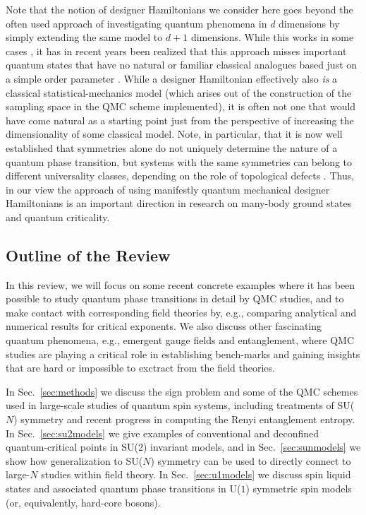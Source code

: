 \documentclass[range]{ar2e}
\begin{document}
Note that the notion of designer Hamiltonians we consider here goes beyond the often used approach of investigating quantum phenomena 
in $d$ dimensions by simply extending the same model to $d+1$ dimensions. While this works in some cases \cite{Rieger94,Sorensen92,Nahum11}, 
it has in recent years been realized that this approach misses important quantum states that have no natural or familiar classical 
analogues based just on a simple order parameter \cite{Senthil04a,Fradkin04,Sachdev08}. While a designer Hamiltonian effectively also {\it is} 
a classical statistical-mechanics model (which arises out of the construction of the sampling space in the QMC scheme implemented), it is 
often not one that would have come natural as a starting point just from the perspective of increasing the dimensionality of some
classical model. Note, in particular, that it is now well established that symmetries alone do not uniquely determine the nature of a 
quantum phase transition, but systems with the same symmetries can belong to different universality classes, depending on the role of topological 
defects \cite{Motrunich04}. Thus, in our view the approach of using manifestly quantum mechanical designer Hamiltonians is an important direction
in research on many-body ground states and quantum criticality.

\subsection{Outline of the Review}

In this review, we will focus on some recent concrete examples where it has been possible to study quantum phase transitions in detail 
by QMC studies, and to make contact with corresponding field theories by, e.g., comparing analytical and numerical results for critical 
exponents. We also discuss other fascinating quantum phenomena, e.g., emergent gauge fields and entanglement, where QMC studies are
playing a critical role in establishing bench-marks and gaining insights that are hard or impossible to exctract from the field theories.

In Sec.~\ref{sec:methods} we discuss the sign problem and some of the QMC schemes used in large-scale studies of quantum spin systems, 
including treatments of SU($N$) symmetry and recent progress in computing the Renyi entanglement entropy. In Sec.~\ref{sec:su2models} 
we give examples of conventional and deconfined quantum-critical points in SU(2) invariant models, and in Sec.~\ref{sec:sunmodels} 
we show how generalization to SU($N$) symmetry can be used to directly connect to large-$N$ studies within field theory. In Sec.~\ref{sec:u1models} 
we discuss spin liquid states and associated quantum phase transitions in U($1$) symmetric spin models (or, equivalently, hard-core bosons). 
\end{document}
